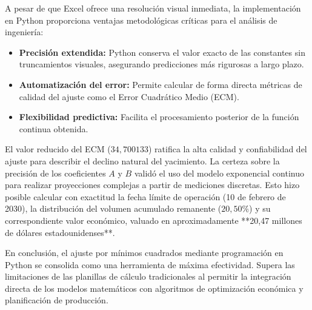 A pesar de que Excel ofrece una resolución visual inmediata, la implementación en Python proporciona ventajas metodológicas críticas para el análisis de ingeniería:
\begin{itemize}
\item \textbf{Precisión extendida:} Python conserva el valor exacto de las constantes sin truncamientos visuales, asegurando predicciones más rigurosas a largo plazo.
\item \textbf{Automatización del error:} Permite calcular de forma directa métricas de calidad del ajuste como el Error Cuadrático Medio (ECM).
\item \textbf{Flexibilidad predictiva:} Facilita el procesamiento posterior de la función continua obtenida.
\end{itemize}

El valor reducido del ECM ($34,700133$) ratifica la alta calidad y confiabilidad del ajuste para describir el declino natural del yacimiento. La certeza sobre la precisión de los coeficientes $A$ y $B$ validó el uso del modelo exponencial continuo para realizar proyecciones complejas a partir de mediciones discretas. Esto hizo posible calcular con exactitud la fecha límite de operación (10 de febrero de 2030), la distribución del volumen acumulado remanente ($20,50\%$) y su correspondiente valor económico, valuado en aproximadamente **20,47 millones de dólares estadounidenses**.

En conclusión, el ajuste por mínimos cuadrados mediante programación en Python se consolida como una herramienta de máxima efectividad. Supera las limitaciones de las planillas de cálculo tradicionales al permitir la integración directa de los modelos matemáticos con algoritmos de optimización económica y planificación de producción.